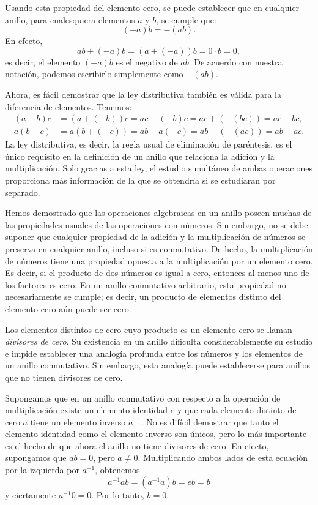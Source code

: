Usando esta propiedad del elemento cero, se puede establecer que en cualquier anillo, para cualesquiera elementos $a$ y $b$, se cumple que:
$$(-a) b = -(ab).$$
En efecto,
$$ab + (-a) b = (a + (-a)) b = 0 \cdot b = 0,$$
es decir, el elemento $(-a) b$ es el negativo de $ab$. De acuerdo con nuestra notación, podemos escribirlo simplemente como $-(ab)$.

Ahora, es fácil demostrar que la ley distributiva también es válida para la diferencia de elementos. Tenemos:
\begin{align*}
    (a - b) c & = (a + (-b)) c = ac + (-b)c = ac + (-(bc)) = ac - bc, \\
    a (b - c) & = a (b + (-c)) = ab + a (-c) = ab + (-(ac)) = ab - ac.
\end{align*}
La ley distributiva, es decir, la regla usual de eliminación de paréntesis, es el único requisito en la definición de un anillo que relaciona la adición y la multiplicación. Solo gracias a esta ley, el estudio simultáneo de ambas operaciones proporciona más información de la que se obtendría si se estudiaran por separado.

\newpage

Hemos demostrado que las operaciones algebraicas en un anillo poseen muchas de las propiedades usuales de las operaciones con números. Sin embargo, no se debe suponer que cualquier propiedad de la adición y la multiplicación de números se preserva en cualquier anillo, incluso si es conmutativo. De hecho, la multiplicación de números tiene una propiedad opuesta a la multiplicación por un elemento cero. Es decir, si el producto de dos números es igual a cero, entonces al menos uno de los factores es cero. En un anillo conmutativo arbitrario, esta propiedad no necesariamente se cumple; es decir, un producto de elementos distinto del elemento cero aún puede ser cero.

Los elementos distintos de cero cuyo producto es un elemento cero se llaman \emph{divisores de cero}. Su existencia en un anillo dificulta considerablemente su estudio e impide establecer una analogía profunda entre los números y los elementos de un anillo conmutativo. Sin embargo, esta analogía puede establecerse para anillos que no tienen divisores de cero.

Supongamos que en un anillo conmutativo con respecto a la operación de multiplicación existe un elemento identidad $e$ y que cada elemento distinto de cero $a$ tiene un elemento inverso $a^{-1}$. No es difícil demostrar que tanto el elemento identidad como el elemento inverso son únicos, pero lo más importante es el hecho de que ahora el anillo no tiene divisores de cero. En efecto, supongamos que $ab = 0$, pero $a \neq 0$. Multiplicando ambos lados de esta ecuación por la izquierda por $a^{-1}$, obtenemos
$$a^{-1}ab = \left(a^{-1}a\right) b = eb = b$$
y ciertamente $a^{-1} 0 = 0$. Por lo tanto, $b = 0$.

